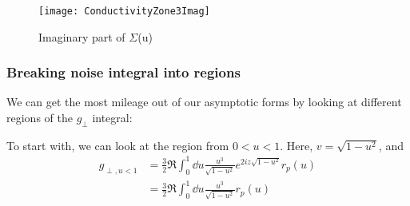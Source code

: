 \documentclass[11pt]{article}
\begin{document}
	\begin{figure}[htp]
		\centering
		\texttt{[image: ConductivityZone3Imag]}
		\caption{Imaginary part of $\Sigma$(u)} \label{fig:ConductivityIm}
	\end{figure}

	\subsubsection{Breaking noise integral into regions} \label{subsubsec:noiseregions}
	We can get the most mileage out of our asymptotic forms by looking at different regions of the $g_\perp$ integral:

	To start with, we can look at the region from $0 < u < 1$.
	Here, $v = \sqrt{1 - u^2}$, and
	\begin{align}
		g_{\perp, u < 1} &= \frac32 \Re \int_0^{1} \dd{u} \frac{u^3}{\sqrt{1 - u^2}} e^{2 i z \sqrt{1 - u^2}} r_p(u) \\
			&= \frac32 \Re \int_0^{1} \dd{u} \frac{u^3}{\sqrt{1 - u^2}} r_p(u)
	\end{align}

	\newpage
	\listoftodos
	\newpage
	\printbibliography
\end{document}
